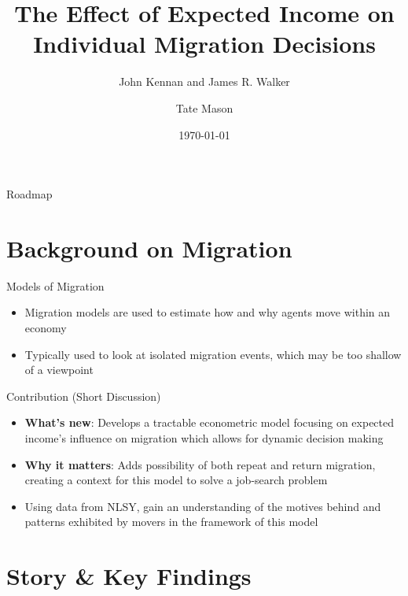 \documentclass[aspectratio=169,professionalfonts]{beamer}
\title[Migration Decisions]{The Effect of Expected Income on Individual Migration Decisions}
\subtitle{John Kennan and James R. Walker}
\author[Tate Mason]{Tate Mason}
\institute[UGA]{John Munro Godfrey Sr. Dept. of Economics \\ University of Georgia}
\date{\today}
\newcommand{\hl}[1]{\textbf{\textcolor{UGARed}{#1}}}
\begin{document}
\begin{frame}
  \titlepage
\end{frame}

\begin{frame}{Roadmap}
  \tableofcontents
\end{frame}

\section{Background on Migration}

\begin{frame}{Models of Migration}
  \begin{itemize}
    \item Migration models are used to estimate how and why agents move within an economy
    \item Typically used to look at isolated migration events, which may be too shallow of a viewpoint
  \end{itemize}
\end{frame}

\begin{frame}{Contribution (Short Discussion)}
  \begin{itemize}
    \item \hl{What’s new}: Develops a tractable econometric model focusing on expected income's influence on migration which allows for dynamic decision making
    \item \hl{Why it matters}: Adds possibility of both repeat and return migration, creating a context for this model to solve a job-search problem
    \item Using data from NLSY, gain an understanding of the motives behind and patterns exhibited by movers in the framework of this model
  \end{itemize}
\end{frame}

\section{Story \& Key Findings}
\end{document}
